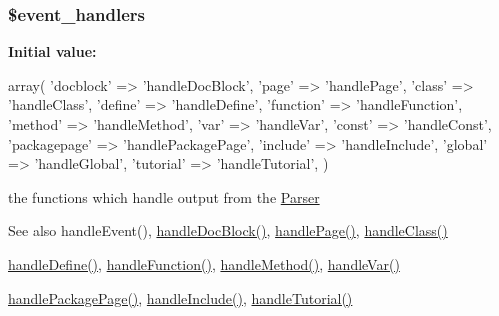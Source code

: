 \hypertarget{classphp_documentor___intermediate_parser_a43c58b8476d3252c39f474e1eb9169df}{
\subsubsection[{\$event\-\_\-handlers}]{\setlength{\rightskip}{0pt plus 5cm}\$event\-\_\-handlers}}\label{classphp_documentor___intermediate_parser_a43c58b8476d3252c39f474e1eb9169df}
{\bfseries \-Initial value\-:}
\begin{DoxyCode}
 array(
            'docblock' => 'handleDocBlock',
            'page' => 'handlePage',
            'class' => 'handleClass',
            'define' => 'handleDefine',
            'function' => 'handleFunction',
            'method' => 'handleMethod',
            'var' => 'handleVar',
            'const' => 'handleConst',
            'packagepage' => 'handlePackagePage',
            'include' => 'handleInclude',
            'global' => 'handleGlobal',
            'tutorial' => 'handleTutorial',
            )
\end{DoxyCode}
the functions which handle output from the \hyperlink{class_parser}{\-Parser} \begin{DoxySeeAlso}{\-See also}
handle\-Event(), \hyperlink{classphp_documentor___intermediate_parser_ac67ef1d2950219672764fa969c3ed1bd}{handle\-Doc\-Block()}, \hyperlink{classphp_documentor___intermediate_parser_a542acce45784b22cc6a875d6e4aae602}{handle\-Page()}, \hyperlink{classphp_documentor___intermediate_parser_a80452a620933e1cdf5e66a92bbbaa743}{handle\-Class()} 

\hyperlink{classphp_documentor___intermediate_parser_a48c4c3f8328e1a71a932f9c0a7b08db6}{handle\-Define()}, \hyperlink{classphp_documentor___intermediate_parser_aa259ad80c83f18ef8ba951ad372a622d}{handle\-Function()}, \hyperlink{classphp_documentor___intermediate_parser_a30ce3810771b4b88663ecd22fee1a2ad}{handle\-Method()}, \hyperlink{classphp_documentor___intermediate_parser_a43880024224e56cbe4951bc3f7128129}{handle\-Var()} 

\hyperlink{classphp_documentor___intermediate_parser_a6774b93c9e6e887a177ac596f3fcdfae}{handle\-Package\-Page()}, \hyperlink{classphp_documentor___intermediate_parser_a7d72c4075fba0eecb4419d0b25db3b1e}{handle\-Include()}, \hyperlink{classphp_documentor___intermediate_parser_a7467009370c6e6274f666aa329d729bc}{handle\-Tutorial()} 
\end{DoxySeeAlso}



